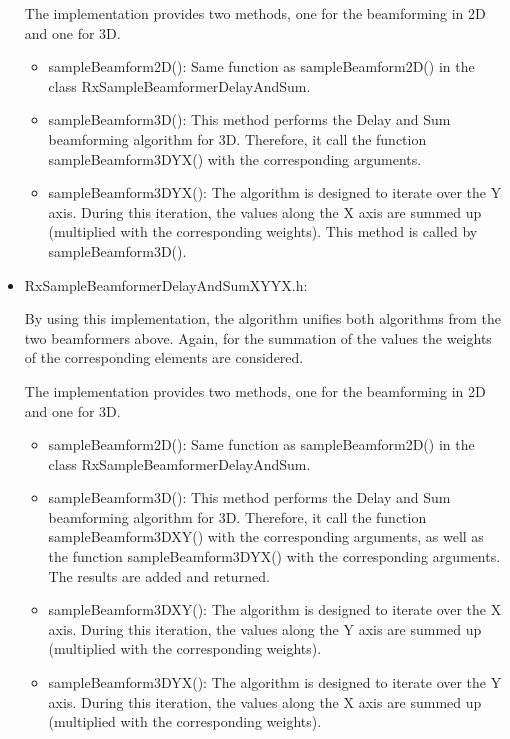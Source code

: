 \documentclass[12pt,a4paper,oneside]{scrartcl}
\begin{document}
\begin{itemize}
    The implementation provides two methods, one for the beamforming in 2D and one for 3D.
      \begin{itemize}
        \item sampleBeamform2D():
          Same function as sampleBeamform2D() in the class RxSampleBeamformerDelayAndSum.
        \item sampleBeamform3D():
          This method performs the Delay and Sum beamforming algorithm for 3D.
          Therefore, it call the function sampleBeamform3DYX() with the corresponding arguments.
        \item sampleBeamform3DYX():
          The algorithm is designed to iterate over the Y axis.
          During this iteration, the values along the X axis are summed up (multiplied with the corresponding weights).
          This method is called by sampleBeamform3D().
      \end{itemize}

  \item RxSampleBeamformerDelayAndSumXYYX.h:

    By using this implementation, the algorithm unifies both algorithms from the two beamformers above.
    Again, for the summation of the values the weights of the corresponding elements are considered.

    The implementation provides two methods, one for the beamforming in 2D and one for 3D.
      \begin{itemize}
        \item sampleBeamform2D():
          Same function as sampleBeamform2D() in the class RxSampleBeamformerDelayAndSum.
        \item sampleBeamform3D():
          This method performs the Delay and Sum beamforming algorithm for 3D.
          Therefore, it call the function sampleBeamform3DXY() with the corresponding arguments, as well as the function sampleBeamform3DYX() with the corresponding arguments.
          The results are added and returned.
        \item sampleBeamform3DXY():
          The algorithm is designed to iterate over the X axis.
          During this iteration, the values along the Y axis are summed up (multiplied with the corresponding weights).
        \item sampleBeamform3DYX():
          The algorithm is designed to iterate over the Y axis.
          During this iteration, the values along the X axis are summed up (multiplied with the corresponding weights).
      \end{itemize}


\end{itemize}
\end{document}
